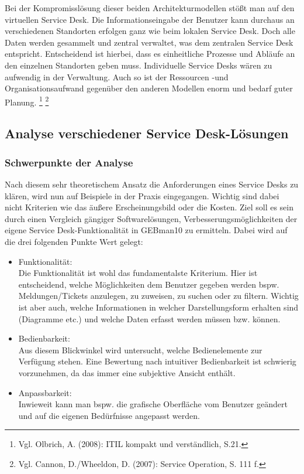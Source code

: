\noindent
Bei der Kompromisslösung dieser beiden Architekturmodellen stößt man auf den virtuellen Service Desk. Die Informationseingabe der Benutzer kann durchaus an verschiedenen Standorten erfolgen ganz wie beim lokalen Service Desk. Doch alle Daten werden gesammelt und zentral verwaltet, was dem zentralen Service Desk entspricht. Entscheidend ist hierbei, dass es einheitliche Prozesse und Abläufe an den einzelnen Standorten geben muss. Individuelle Service Desks wären zu aufwendig in der Verwaltung. Auch so ist der Ressourcen -und Organisationsaufwand gegenüber den anderen Modellen enorm und bedarf guter Planung. \footnote{Vgl. Olbrich, A. (2008): ITIL kompakt und verständlich, S.21.} \footnote{Vgl. Cannon, D./Wheeldon, D. (2007): Service Operation, S. 111 f.} \\


\subsection{Analyse verschiedener Service Desk-Lösungen}

\subsubsection{Schwerpunkte der Analyse}

\noindent
Nach diesem sehr theoretischem Ansatz die Anforderungen eines Service Desks zu klären, wird nun auf Beispiele in der Praxis eingegangen. Wichtig sind dabei nicht Kriterien wie das äußere Erscheinungsbild oder die Kosten. Ziel soll es sein durch einen Vergleich gängiger Softwarelösungen, Verbesserungsmöglichkeiten der eigene Service Desk-Funktionalität in GEBman10 zu ermitteln. Dabei wird auf die drei folgenden Punkte Wert gelegt:

\begin{itemize}
\item Funktionalität:\\
		Die Funktionalität ist wohl das fundamentalste Kriterium. Hier ist entscheidend, welche 			
		Möglichkeiten dem Benutzer gegeben werden bspw. Meldungen/Tickets anzulegen, zu 
		zuweisen, zu suchen oder zu filtern. Wichtig ist aber auch, welche Informationen in welcher 
		Darstellungsform erhalten sind (Diagramme etc.) und welche Daten erfasst werden müssen 
		bzw. können.\\
		 
\item Bedienbarkeit:\\
		Aus diesem Blickwinkel wird untersucht, welche Bedienelemente zur Verfügung stehen. Eine	
		Bewertung nach intuitiver Bedienbarkeit ist schwierig vorzunehmen, da das immer eine
		subjektive Ansicht enthält.\\
		
\item Anpassbarkeit:\\
		Inwieweit kann man bspw. die grafische Oberfläche vom Benutzer geändert und auf die 
		eigenen Bedürfnisse angepasst werden.\\		
\end{itemize}


